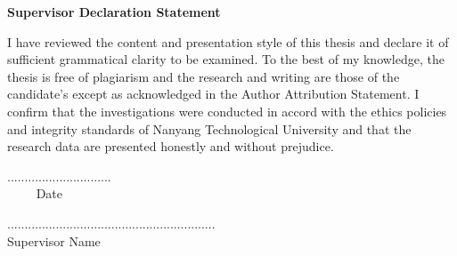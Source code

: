 \newpage
\begin{center}
	{\large \bfseries Supervisor Declaration Statement}
\end{center}

\vspace{3em}

I have reviewed the content and presentation style of this thesis and declare it of sufficient grammatical clarity to be examined. To the best of my knowledge, the thesis is free of plagiarism and the research and writing are those of the candidate’s except as acknowledged in the Author Attribution Statement. I confirm that the investigations were conducted in accord with the ethics policies and integrity standards of Nanyang Technological University and that the research data are presented honestly and without prejudice.

\vspace{25em}

\begin{minipage}{0.45\textwidth}
	\begin{flushleft}
		.............................. \\
		$\quad\quad$ Date
	\end{flushleft}
\end{minipage}
\begin{minipage}{0.45\textwidth}
	\begin{flushright}
		............................................................ \\
		\centering Supervisor Name
	\end{flushright}
\end{minipage}